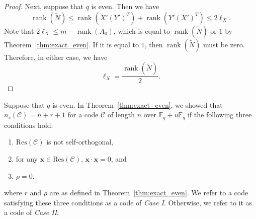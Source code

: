 \documentclass{article}
\theoremstyle{definition}
\theoremstyle{remark}
\begin{document}
\begin{proof}
Next, suppose that $q$ is even. Then we have
\[
\operatorname{rank}(\tilde{N})\le \operatorname{rank}(X'(Y')^T)+\operatorname{rank}(Y'(X')^T)\le 2\ell_X.
\]
Note that $2\ell_X\le m-\operatorname{rank}(A_0)$, which is equal to $\operatorname{rank}(\tilde{N})$ or $1$ by Theorem~\ref{thm:exact_even}. If it is equal to $1$, then $\operatorname{rank}(\tilde{N})$ must be zero. Therefore, in either case, we have
\[
\ell_X=\frac{\operatorname{rank}(\tilde{N})}{2}.
\]
\end{proof}

Suppose that $q$ is even. In Theorem~\ref{thm:exact_even}, we showed that $n_s(\mathcal{C})=n+r+1$ for a code $\mathcal{C}$ of length $n$ over $\mathbb{F}_q+u\mathbb{F}_q$ if the following three conditions hold:
\begin{enumerate}
    \item[(i)] $\mathrm{Res}(\mathcal{C})$ is not self-orthogonal,
    \item[(ii)] for any $\mathbf{x}\in \mathrm{Res}(\mathcal{C})$, $\mathbf{x}\cdot \mathbf{x}=0$, and
    \item[(iii)] $\rho=0$,
\end{enumerate}
where $r$ and $\rho$ are as defined in Theorem~\ref{thm:exact_even}. We refer to a code satisfying these three conditions as a code of \textit{Case I}. Otherwise, we refer to it as a code of \textit{Case II}.
\end{document}
